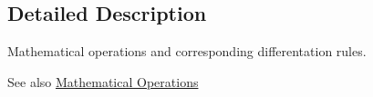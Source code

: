 \subsection{Detailed Description}
Mathematical operations and corresponding differentation rules. 

\begin{DoxySeeAlso}{See also}
\hyperlink{group__MathematicalOperationsGroup}{Mathematical Operations} 
\end{DoxySeeAlso}
